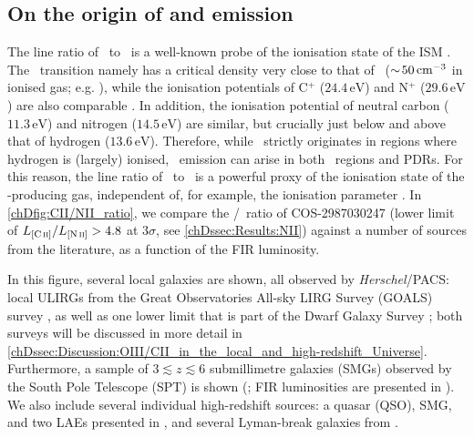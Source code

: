 \subsection{On the origin of \texorpdfstring{\NIILam}{[N II] 205 μm} and \texorpdfstring{\CIILam}{[C II] 158 μm} emission}
\label{chDssec:Discussion:CII/NII}

The line ratio of \CII\ to \NII\ is a well-known probe of the ionisation state of the ISM \citep[e.g.][]{2012A&A...542L..34N}. The \NIILam\ transition namely has a critical density very close to that of \CIILam\ ($\sim \! 50 \, \mathrm{cm^{-3}}$ in ionised gas; e.g. \citealt{2013ARA&A..51..105C}), while the ionisation potentials of C$^+$ ($24.4 \, \mathrm{eV}$) and N$^+$ ($29.6 \, \mathrm{eV}$) are also comparable \citep[e.g.][]{2014ApJ...782L..17D}. In addition, the ionisation potential of neutral carbon ($11.3 \, \mathrm{eV}$) and nitrogen ($14.5 \, \mathrm{eV}$) are similar, but crucially just below and above that of hydrogen ($13.6 \, \mathrm{eV}$). Therefore, while \NII\ strictly originates in regions where hydrogen is (largely) ionised, \CII\ emission can arise in both \HII\ regions and PDRs. For this reason, the line ratio of \CII\ to \NII\ is a powerful proxy of the ionisation state of the \CII-producing gas, independent of, for example, the ionisation parameter \citep[e.g.][]{2012A&A...542L..34N}. In \cref{chDfig:CII/NII_ratio}, we compare the \CII/\NII\ ratio of COS-2987030247 (lower limit of $L_\CII/L_\NII > 4.8$ at $3 \sigma$, see \cref{chDssec:Results:NII}) against a number of sources from the literature, as a function of the FIR luminosity.

In this figure, several local galaxies are shown, all observed by \textit{Herschel}/PACS: local ULIRGs from the Great Observatories All-sky LIRG Survey (GOALS) survey \citep{2017ApJ...846...32D}, as well as one lower limit that is part of the Dwarf Galaxy Survey \citep[DGS;][]{2015A&A...578A..53C, 2019A&A...626A..23C}; both surveys will be discussed in more detail in \cref{chDssec:Discussion:OIII/CII_in_the_local_and_high-redshift_Universe}. Furthermore, a sample of $3 \lesssim z \lesssim 6$ submillimetre galaxies (SMGs) observed by the South Pole Telescope (SPT) is shown (\citealt{2020MNRAS.494.4090C}; FIR luminosities are presented in \citealt{2020ApJ...902...78R}). We also include several individual high-redshift sources: a quasar (QSO), SMG, and two LAEs presented in \citet{2014ApJ...782L..17D}, and several Lyman-break galaxies from \citet{2016ApJ...832..151P, 2019ApJ...882..168P}.

